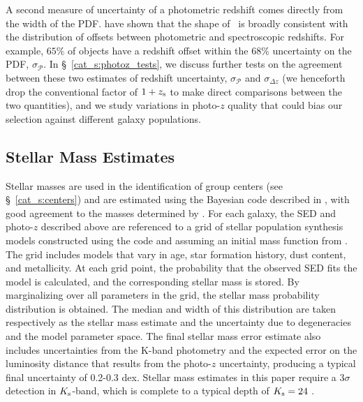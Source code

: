 A second measure of uncertainty of a photometric redshift comes
directly from the width of the PDF. \citet{Ilbert2009} have shown
that the shape of \pz\ is broadly consistent with the distribution of
offsets between photometric and spectroscopic redshifts. For example,
$65\%$ of objects have a redshift offset within the $68\%$ uncertainty
on the PDF, $\sigma_{\mathcal{P}}$. In \S~\ref{cat_s:photoz_tests}, we
discuss further tests on the agreement between these two estimates of
redshift uncertainty, $\sigma_{\mathcal{P}}$ and $\sigma_{\Delta z}$ (we
henceforth drop the conventional factor of $1+\mbox{$z_{\rm s}$}$ to make direct
comparisons between the two quantities), and we study variations in
photo-$z$ quality that could bias our selection against different
galaxy populations.

\subsection{Stellar Mass Estimates}
\label{cat_s:stellarmass}

Stellar masses are used in the identification of group centers (see
\S~\ref{cat_s:centers}) and are estimated using the Bayesian code
described in \citet{Bundy2006a}, with good agreement to the
masses determined by \citet{Drory2009}. For each galaxy, the SED and
photo-$z$ described above are referenced to a grid of stellar population
synthesis models constructed using the \citet{Bruzual2003} code and
assuming an initial mass function from \citet{Chabrier2003}.  The
grid includes models that vary in age, star formation history, dust
content, and metallicity.  At each grid point, the probability that
the observed SED fits the model is calculated, and the corresponding
stellar mass is stored. 
By marginalizing over all parameters in the grid, the stellar mass
probability distribution is obtained.  The median and width of this
distribution are taken respectively as the stellar mass estimate and
the uncertainty due to degeneracies and the model parameter space.
The final stellar mass error estimate also includes uncertainties from
the K-band photometry and the expected error on the luminosity
distance that results from the photo-$z$ uncertainty, producing a typical
final uncertainty of 0.2-0.3 dex. Stellar mass estimates in this paper
require a $3\sigma$ detection in $K_{\rm s}$-band, which
is complete to a typical depth of $K_{\rm s}=24$ \citep{McCracken2010}.




